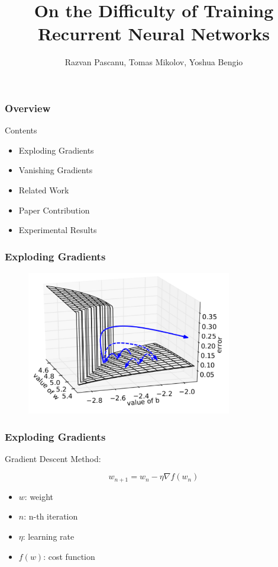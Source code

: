\documentclass{beamer}
\begin{document}
\title{On the Difficulty of Training Recurrent Neural Networks}
\subtitle{Razvan Pascanu, Tomas Mikolov, Yoshua Bengio}


\begin{frame}
	\titlepage
\end{frame}


\begin{frame}
	\frametitle{Overview}
	
	\begin{block}{Contents}
		\begin{itemize}
			\item{Exploding Gradients} 
			\item{Vanishing Gradients} 
			\item{Related Work} 
			\item{Paper Contribution}
			\item{Experimental Results}
		\end{itemize}
	\end{block}
\end{frame}


\begin{frame}
	\frametitle{Exploding Gradients}
	
	\begin{figure}
		\includegraphics[width=0.8\textwidth]{imgs/geometric_perspective}
	\end{figure}
\end{frame}

\begin{frame}
	\frametitle{Exploding Gradients}
	
	Gradient Descent Method:
	
	\[
		w_{n + 1} = w_{n} - \eta \nabla f(w_{n})
	\]
	
	\begin{itemize}
		\item{$w$: weight}
		\item{$n$: n-th iteration}
		\item{$\eta$: learning rate}
		\item{$f(w)$: cost function}
	\end{itemize}
\end{frame}
\end{document}

